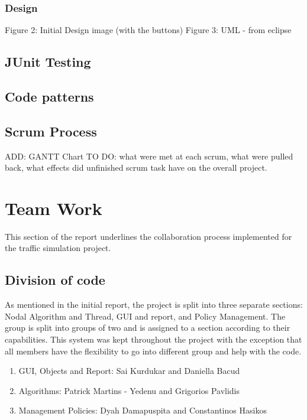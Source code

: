 \documentclass{article}[11pt,Tahoma]
\begin{document}
\begin{Abstract}
		\subsubsection{Design}
			 	Figure 2: Initial Design image (with the buttons)
				Figure 3: UML - from eclipse
		\subsection{JUnit Testing}
	 	\subsection{Code patterns}
		\subsection{Scrum Process}
			ADD: GANTT Chart
			TO DO: what were met at each scrum, what were pulled back, what effects did unfinished scrum task have on the overall project.
	\section{Team Work}
		This section of the report underlines the collaboration process implemented for the traffic simulation project.
		\subsection{Division of code}
			As mentioned in the initial report, the project is split into three separate sections: Nodal Algorithm and Thread, GUI and report, and Policy Management.  The group is split into groups of two and is assigned to a section according to their capabilities.  This system was kept throughout the project with the exception that all members have the flexibility to go into different group and help with the code.  
			\begin{enumerate}[noitemsep]
                \item GUI, Objects and Report: Sai Kurdukar and Daniella Bacud
                \item Algorithms: Patrick Martins - Yedenu and Grigorios Pavlidis
                \item Management Policies: Dyah Damapuspita and Constantinos Hasikos
            \end{enumerate}

\end{Abstract}
\end{document}
